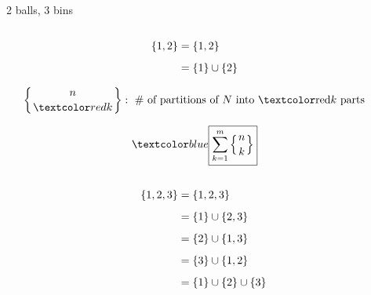 \begin{frame}{}
  \begin{center}
    2 balls, 3 bins \qquad {}
  \end{center}

  \begin{columns}
    \pause
      \begin{center}
      \end{center}
      \pause
      \begin{center}
        \pause
        \begin{align*}
          \{1, 2\} &= \{1, 2\} \\[5pt]
                     &= \{1\} \cup \{2\}
        \end{align*}

        \pause

        \pause
        \[
          \left\{ n \atop \red{k} \right\}: \text{ \# of partitions of $N$ into \red{$k$} parts}
        \]

        \pause
        \vspace{-0.30cm}
        \[
          \blue{\boxed{\sum_{k=1}^{m} \left\{ n \atop k \right\}}}
        \]
      \end{center}
  \end{columns}
\end{frame}

\begin{frame}{}
  \begin{align*}
    \{1, 2, 3\} &= \{1, 2, 3\} \\[5pt]
                  &= \{1\} \cup \{2, 3\}  \\[5pt]
                  &= \{2\} \cup \{1, 3\}  \\[5pt]
                  &= \{3\} \cup \{1, 2\}  \\[5pt]
                  &= \{1\} \cup \{2\} \cup \{3\}
  \end{align*}
\end{frame}

